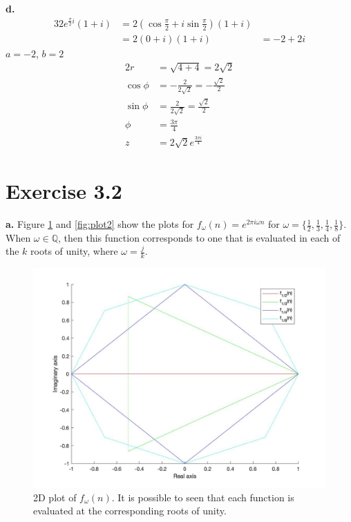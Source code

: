 \documentclass[12pt]{article}
\begin{document}
	\textbf{d.}
	\begin{alignat*}{3}
	2 e^{\frac{\pi}{2} i}(1 + i ) &= 2 (\cos\frac{\pi}{2} + i\sin \frac{\pi}{2})(1 + i)\\
	&= 2(0 + i)(1 + i) &= -2 + 2i
	\end{alignat*}
	$a = -2$, $b = 2$
	\begin{alignat*}{2}
	r &= \sqrt{4 + 4} = 2\sqrt{2}\\
	\cos\phi &= -\frac{2}{2\sqrt{2}} = -\frac{\sqrt{2}}{2}\\
	\sin\phi &= \frac{2}{2\sqrt{2}} = \frac{\sqrt{2}}{2}\\
	\phi &= \frac{3\pi}{4}\\
	z &= 2\sqrt{2}e^{\frac{3\pi i}{4}}
	\end{alignat*}
	
	\newpage
	\section*{Exercise 3.2}
	\textbf{a.} Figure \ref{fig:plot1} and \ref{fig:plot2} show the plots for $f_\omega(n) = e^{2\pi i \omega n}$ for $\omega = \{\frac{1}{2}, \frac{1}{3}, \frac{1}{4}, \frac{1}{8}\}$. When $\omega \in \mathbb{Q}$, then this function corresponds to one that is evaluated in each of the $k$ roots of unity, where $\omega = \frac{j}{k}$. \\
	
	\begin{figure}[h!]
	\centering
	\includegraphics[width = 0.75\linewidth]{plot_2D}
	\caption{2D plot of $f_\omega(n)$. It is possible to seen that each function is evaluated at the corresponding roots of unity. }
	\label{fig:plot1}
	\end{figure}
	
\end{document}
